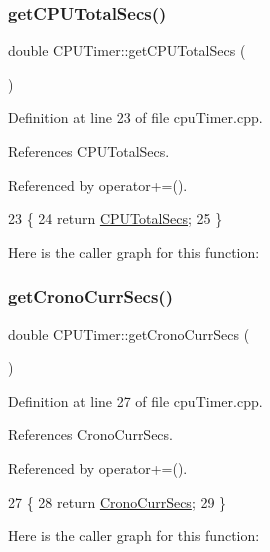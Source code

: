 \subsubsection{\texorpdfstring{get\+C\+P\+U\+Total\+Secs()}{getCPUTotalSecs()}}
{\footnotesize\ttfamily double C\+P\+U\+Timer\+::get\+C\+P\+U\+Total\+Secs (\begin{DoxyParamCaption}{ }\end{DoxyParamCaption})}



Definition at line 23 of file cpu\+Timer.\+cpp.



References C\+P\+U\+Total\+Secs.



Referenced by operator+=().


\begin{DoxyCode}
23                                  \{
24     \textcolor{keywordflow}{return} \hyperlink{class_c_p_u_timer_a1f61a2313ec71eb67d658c482420abe7}{CPUTotalSecs};
25 \}
\end{DoxyCode}
Here is the caller graph for this function\+:
\mbox{\label{class_c_p_u_timer_a363d9ba80f897fe24914cce080bf3b52}} 
\subsubsection{\texorpdfstring{get\+Crono\+Curr\+Secs()}{getCronoCurrSecs()}}
{\footnotesize\ttfamily double C\+P\+U\+Timer\+::get\+Crono\+Curr\+Secs (\begin{DoxyParamCaption}{ }\end{DoxyParamCaption})}



Definition at line 27 of file cpu\+Timer.\+cpp.



References Crono\+Curr\+Secs.



Referenced by operator+=().


\begin{DoxyCode}
27                                   \{
28     \textcolor{keywordflow}{return} \hyperlink{class_c_p_u_timer_a5cd38d0e4893710f1c85f1aa03961cbc}{CronoCurrSecs};
29 \}
\end{DoxyCode}
Here is the caller graph for this function\+:
\mbox{\label{class_c_p_u_timer_aa8736023dbfa50166f8e49960ad84a84}} 
